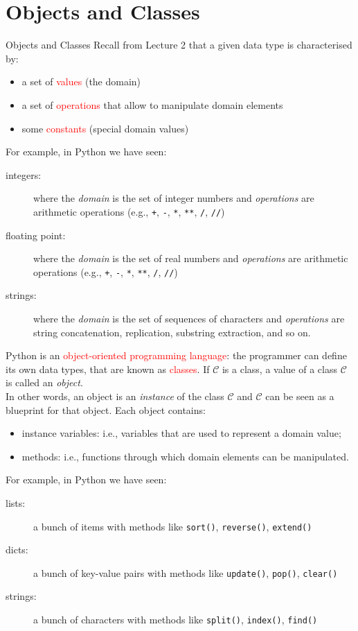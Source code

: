 \documentclass[t,handout,9pt]{beamer}
\begin{document}
\section{Objects and Classes}
\begin{frame}{Objects and Classes}
\vfill
Recall from Lecture 2 that a given data type is characterised by:
\begin{itemize}
	\item a set of \textcolor{red}{values} (the domain)
	\item a set of \textcolor{red}{operations} that allow to manipulate domain elements
	\item some \textcolor{red}{constants} (special domain values)
\end{itemize}
\vfill
For example, in Python we have seen:
\begin{description}
	\item[integers:] where the \textit{domain} is the set of integer numbers and \textit{operations} are arithmetic operations (e.g., \texttt{+}, \texttt{-}, \texttt{*}, \texttt{**}, \texttt{/}, \texttt{//})
	\item[floating point:] where the \textit{domain} is the set of real numbers and \textit{operations} are arithmetic operations (e.g., \texttt{+}, \texttt{-}, \texttt{*}, \texttt{**}, \texttt{/}, \texttt{//})
	\item[strings:] where the \textit{domain} is the set of sequences of characters and \textit{operations} are string concatenation, replication, substring extraction, and so on.
\end{description}
\vfill
\end{frame}
%
\begin{frame}
\vfill
Python is an \textcolor{red}{object-oriented programming language}: the programmer can define its own data types, that are known as \textcolor{red}{classes}.
\vfill
If $\mathcal{C}$ is a class, a value of a class $\mathcal{C}$ is called an \textit{object}.\\
In other words, an object is an \textit{instance} of the class $\mathcal{C}$ and $\mathcal{C}$ can be seen as a blueprint for that object.
\vfill
Each object contains:
\begin{itemize}
	\item instance variables: i.e., variables that are used to represent a domain value;
	\item methods: i.e., functions through which domain elements can be manipulated.
\end{itemize}
\vfill
For example, in Python we have seen:
\begin{description}
	\item[lists:] a bunch of items with methods like \texttt{sort()}, \texttt{reverse()}, \texttt{extend()}
	\item[dicts:] a bunch of key-value pairs with methods like \texttt{update()}, \texttt{pop()}, \texttt{clear()}
	\item[strings:] a bunch of characters with methods like \texttt{split()}, \texttt{index()}, \texttt{find()}
\end{description}
\vfill
\end{frame}
\end{document}
